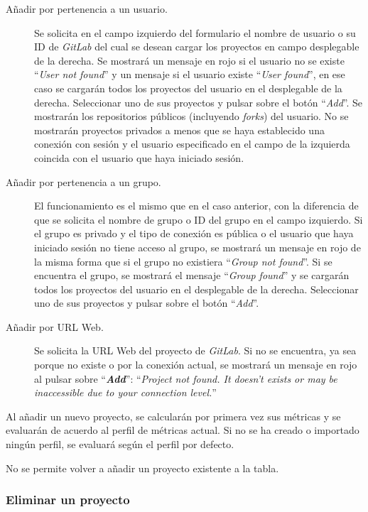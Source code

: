 \begin{description}
	\item[Añadir por pertenencia a un usuario.] Se solicita en el campo izquierdo del formulario el nombre de usuario o su ID de \textit{GitLab} del cual se desean cargar los proyectos en campo desplegable de la derecha. Se mostrará un mensaje en rojo si el usuario no se existe ``\textit{User not found}'' y un mensaje si el usuario existe ``\textit{User found}'', en ese caso se cargarán todos los proyectos del usuario en el desplegable de la derecha. Seleccionar uno de sus proyectos y pulsar sobre el botón ``\textit{Add}''. Se mostrarán los repositorios públicos (incluyendo \textit{forks}) del usuario. No se mostrarán proyectos privados a menos que se haya establecido una conexión con sesión y el usuario especificado en el campo de la izquierda coincida con el usuario que haya iniciado sesión.
	\item[Añadir por pertenencia a un grupo.] El funcionamiento es el mismo que en el caso anterior, con la diferencia de que se solicita el nombre de grupo o ID del grupo en el campo izquierdo. Si el grupo es privado y el tipo de conexión es pública o el usuario que haya iniciado sesión no tiene acceso al grupo, se mostrará un mensaje en rojo de la misma forma que si el grupo no existiera ``\textit{Group not found}''. Si se encuentra el grupo, se mostrará el mensaje ``\textit{Group found}'' y se cargarán todos los proyectos del usuario en el desplegable de la derecha. Seleccionar uno de sus proyectos y pulsar sobre el botón ``\textit{Add}''.
	\item[Añadir por URL Web.] Se solicita la URL Web del proyecto de \textit{GitLab}. Si no se encuentra, ya sea porque no existe o por la conexión actual, se mostrará un mensaje en rojo al pulsar sobre ``\textbf{\textit{Add}}'': ``\textit{Project not found. It doesn't exists or may be inaccessible due to your connection level.}''
\end{description}

Al añadir un nuevo proyecto, se calcularán por primera vez sus métricas y se evaluarán de acuerdo al perfil de métricas actual. Si no se ha creado o importado ningún perfil, se evaluará según el perfil por defecto.

No se permite volver a añadir un proyecto existente a la tabla.

\subsubsection{Eliminar un proyecto}

